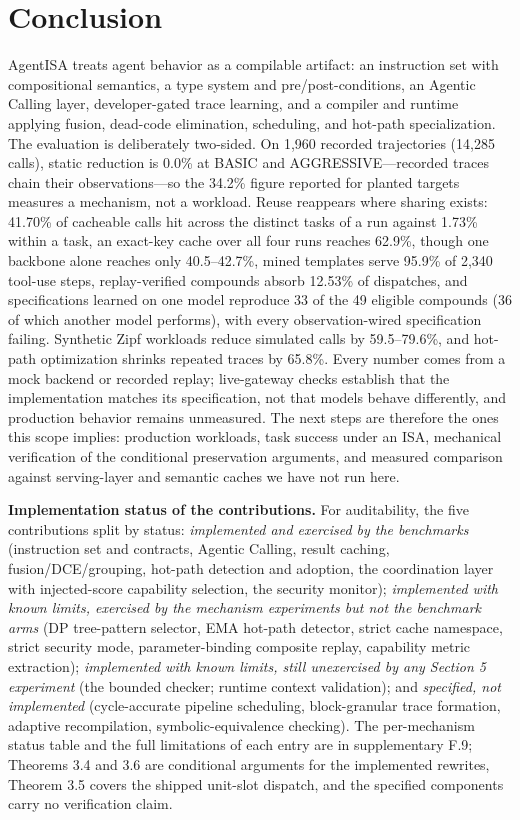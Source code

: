 \documentclass[
  sigconf,
  anonymous]{acmart}
\begin{document}
\section{Conclusion}\label{conclusion}

AgentISA treats agent behavior as a compilable artifact: an instruction
set with compositional semantics, a type system and pre/post-conditions,
an Agentic Calling layer, developer-gated trace learning, and a compiler
and runtime applying fusion, dead-code elimination, scheduling, and
hot-path specialization. The evaluation is deliberately two-sided. On
1,960 recorded trajectories (14,285 calls), static reduction is 0.0\% at
BASIC and AGGRESSIVE---recorded traces chain their observations---so the
34.2\% figure reported for planted targets measures a mechanism, not a
workload. Reuse reappears where sharing exists: 41.70\% of cacheable
calls hit across the distinct tasks of a run against 1.73\% within a
task, an exact-key cache over all four runs reaches 62.9\%, though one
backbone alone reaches only 40.5--42.7\%, mined templates serve 95.9\%
of 2,340 tool-use steps, replay-verified compounds absorb 12.53\% of
dispatches, and specifications learned on one model reproduce 33 of the
49 eligible compounds (36 of which another model performs), with every
observation-wired specification failing. Synthetic Zipf workloads reduce
simulated calls by 59.5--79.6\%, and hot-path optimization shrinks
repeated traces by 65.8\%. Every number comes from a mock backend or
recorded replay; live-gateway checks establish that the implementation
matches its specification, not that models behave differently, and
production behavior remains unmeasured. The next steps are therefore the
ones this scope implies: production workloads, task success under an
ISA, mechanical verification of the conditional preservation arguments,
and measured comparison against serving-layer and semantic caches we
have not run here.

\textbf{Implementation status of the contributions.} For auditability,
the five contributions split by status: \emph{implemented and exercised
by the benchmarks} (instruction set and contracts, Agentic Calling,
result caching, fusion/DCE/grouping, hot-path detection and adoption,
the coordination layer with injected-score capability selection, the
security monitor); \emph{implemented with known limits, exercised by the
mechanism experiments but not the benchmark arms} (DP tree-pattern
selector, EMA hot-path detector, strict cache namespace, strict security
mode, parameter-binding composite replay, capability metric extraction);
\emph{implemented with known limits, still unexercised by any Section 5
experiment} (the bounded checker; runtime context validation); and
\emph{specified, not implemented} (cycle-accurate pipeline scheduling,
block-granular trace formation, adaptive recompilation,
symbolic-equivalence checking). The per-mechanism status table and the
full limitations of each entry are in supplementary F.9; Theorems 3.4
and 3.6 are conditional arguments for the implemented rewrites, Theorem
3.5 covers the shipped unit-slot dispatch, and the specified components
carry no verification claim.
\end{document}
